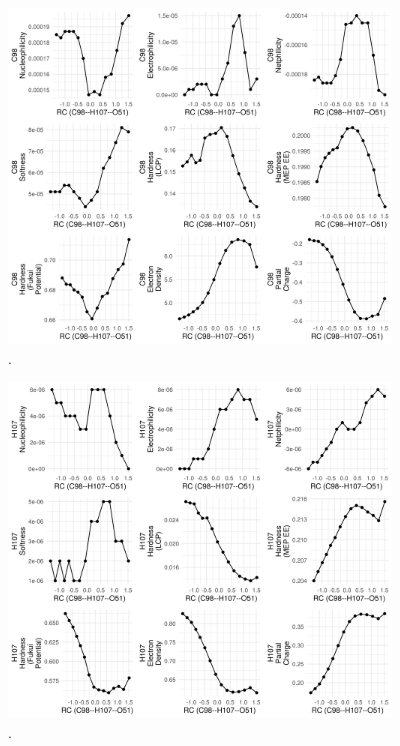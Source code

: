 \documentclass[a4paper,11pt]{refart}
\begin{document}
\hspace*{-\leftmarginwidth}
\begin{minipage}{\fullwidth}
	\begin{figure}[H]
		\begin{center}
			\includegraphics[width=4in]{images/tut6_img4}
			\caption{.}
			\label{fig_tut6_3}
		\end{center}
	\end{figure}
\end{minipage}


\hspace*{-\leftmarginwidth}
\begin{minipage}{\fullwidth}
	\begin{figure}[H]
		\begin{center}
			\includegraphics[width=4in]{images/tut6_img5}
			\caption{.}
			\label{fig_tut6_4}
		\end{center}
	\end{figure}
\end{minipage}
\end{document}
